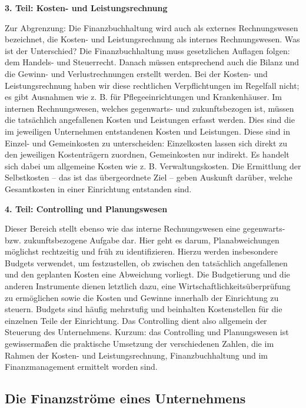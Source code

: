 \documentclass[
  letterpaper,
]{book}
\begin{document}
\textbf{3. Teil: Kosten- und Leistungsrechnung}

Zur Abgrenzung: Die Finanzbuchhaltung wird auch als externes
Rechnungswesen bezeichnet, die Kosten- und Leistungsrechnung als
internes Rechnungswesen. Was ist der Unterschied? Die Finanzbuchhaltung
muss gesetzlichen Auflagen folgen: dem Handels- und Steuerrecht. Danach
müssen entsprechend auch die Bilanz und die Gewinn- und
Verlustrechnungen erstellt werden. Bei der Kosten- und Leistungsrechnung
haben wir diese rechtlichen Verpflichtungen im Regelfall nicht; es gibt
Ausnahmen wie z. B. für Pflegeeinrichtungen und Krankenhäuser. Im
internen Rechnungswesen, welches gegenwarts- und zukunftsbezogen ist,
müssen die tatsächlich angefallenen Kosten und Leistungen erfasst
werden. Dies sind die im jeweiligen Unternehmen entstandenen Kosten und
Leistungen. Diese sind in Einzel- und Gemeinkosten zu unterscheiden:
Einzelkosten lassen sich direkt zu den jeweiligen Kostenträgern
zuordnen, Gemeinkosten nur indirekt. Es handelt sich dabei um allgemeine
Kosten wie z. B. Verwaltungskosten. Die Ermittlung der Selbstkosten --
das ist das übergeordnete Ziel -- geben Auskunft darüber, welche
Gesamtkosten in einer Einrichtung entstanden sind.

\textbf{4. Teil: Controlling und Planungswesen}

Dieser Bereich stellt ebenso wie das interne Rechnungswesen eine
gegenwarts- bzw. zukunftsbezogene Aufgabe dar. Hier geht es darum,
Planabweichungen möglichst rechtzeitig und früh zu identifizieren.
Hierzu werden insbesondere Budgets verwendet, um festzustellen, ob
zwischen den tatsächlich angefallenen und den geplanten Kosten eine
Abweichung vorliegt. Die Budgetierung und die anderen Instrumente dienen
letztlich dazu, eine Wirtschaftlichkeitsüberprüfung zu ermöglichen sowie
die Kosten und Gewinne innerhalb der Einrichtung zu steuern. Budgets
sind häufig mehrstufig und beinhalten Kostenstellen für die einzelnen
Teile der Einrichtung. Das Controlling dient also allgemein der
Steuerung des Unternehmens. Kurzum: das Controlling und Planungswesen
ist gewissermaßen die praktische Umsetzung der verschiedenen Zahlen, die
im Rahmen der Kosten- und Leistungsrechnung, Finanzbuchhaltung und im
Finanzmanagement ermittelt worden sind.

\subsection{Die Finanzströme eines
Unternehmens}\label{die-finanzstrme-eines-unternehmens}
\end{document}
